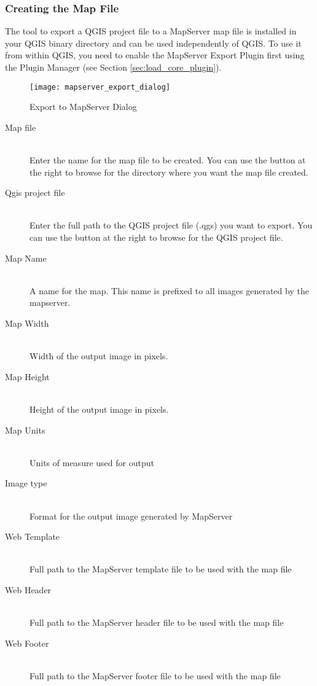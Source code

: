 \subsubsection{Creating the Map File}

The tool  to export a QGIS project file to a MapServer map 
file is installed in your QGIS binary directory and can be used independently of QGIS. 
To use it from within QGIS, you need to enable the MapServer Export Plugin first using the Plugin Manager (see Section \ref{sec:load_core_plugin}).

\begin{figure}[ht]
\begin{center}
  \caption{Export to MapServer Dialog \nixcaption}
  \label{fig:mapserver_export_dialog}\smallskip
  \texttt{[image: mapserver\_export\_dialog]}
\end{center}
\end{figure}

\begin{description}
\item [Map file] \mbox{}\\
Enter the name for the map file to be created. You can use the button at the 
right to browse for the directory where you want the map file created. 
\item [Qgis project file] \mbox{}\\
Enter the full path to the QGIS project file (.qgs) you want to export. You can 
use the button at the right to browse for the QGIS project file.
\item [Map Name] \mbox{}\\
A name for the map. This name is prefixed to all images generated by the mapserver.
\item [Map Width] \mbox{}\\
Width of the output image in pixels.
\item [Map Height] \mbox{}\\
Height of the output image in pixels.
\item [Map Units] \mbox{}\\
Units of measure used for output
\item [Image type] \mbox{}\\
Format for the output image generated by MapServer
\item [Web Template] \mbox{}\\
Full path to the MapServer template file to be used with the map file
\item [Web Header] \mbox{}\\
Full path to the MapServer header file to be used with the map file
\item [Web Footer] \mbox{}\\
Full path to the MapServer footer file to be used with the map file
\end{description}

